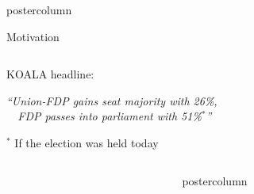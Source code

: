 \documentclass[final,hyperref={pdfpagelabels=false}]{beamer}
\newcommand{\darkgray}[1]{\textcolor{koaladarkgray}{#1}}
\newcommand{\lightgray}[1]{\textcolor{koalagray}{#1}}
\newlength{\columnheight}
\begin{document}
\begin{frame}
\begin{columns}
\begin{column}{1\textwidth}
\begin{beamercolorbox}[center,wd=\textwidth]{postercolumn}
\begin{minipage}[T]{.95\textwidth}
\begin{block}{\footnotesize Motivation}
{{\begin{minipage}{.96\textwidth}
\begin{columns}[t]
\begin{column}{.29\textwidth}
  \begin{mdleftgreen}
  \begin{minipage}{\textwidth}
  \lightgray{\footnotesize KOALA headline:}
  \begin{center}\centering
  \darkgray{\textit{
  ``Union-FDP gains seat majority with 26\%, \ \ \\[0.1cm] \ \ FDP passes into parliament with 51\%$^*$''
  }}
  \end{center}
  \vspace{-0.7ex}
  \lightgray{\tiny ${}^*$ If the election was held today}
  \end{minipage}
  \end{mdleftgreen}
  \end{column}
  \end{columns}
  \end{minipage}
  }
  }

  \vspace{1ex}
\end{block}
\end{minipage}
\end{beamercolorbox}



\vspace{2ex}
\begin{columns}[T]

\begin{column}{.016\textwidth}
\end{column}

\begin{column}{.484\textwidth}
\begin{beamercolorbox}[center,wd=\textwidth]{postercolumn}
\begin{minipage}[T]{.95\textwidth}  %



\end{minipage}
\end{beamercolorbox}
\end{column}
\end{columns}
\end{column}
\end{columns}
\end{frame}
\end{document}
